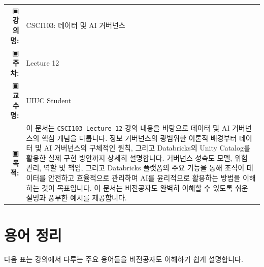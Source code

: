 \documentclass[11pt,a4paper]{article}
\makeatletter
\theoremstyle{definition}
\newcommand{\metainfo}[4]{
\begin{tcolorbox}[
    colback=lightpurple,
    colframe=darkpurple,
    boxrule=1pt,
    arc=2mm,
    left=10pt,
    right=10pt,
    top=8pt,
    bottom=8pt
]
\begin{tabular}{@{}rl@{}}
▣ \textbf{강의명:} & #1 \\[0.3em]
▣ \textbf{주차:} & #2 \\[0.3em]
▣ \textbf{교수명:} & #3 \\[0.3em]
▣ \textbf{목적:} & \begin{minipage}[t]{0.75\textwidth}#4\end{minipage}
\end{tabular}
\end{tcolorbox}
}
\makeatother
\begin{document}
\thispagestyle{firstpage}

\metainfo{CSCI103: 데이터 및 AI 거버넌스}{Lecture 12}{UIUC Student}{
이 문서는 \texttt{CSCI103 Lecture 12} 강의 내용을 바탕으로 데이터 및 AI 거버넌스의 핵심 개념을 다룹니다.
정보 거버넌스의 광범위한 이론적 배경부터 데이터 및 AI 거버넌스의 구체적인 원칙,
그리고 Databricks의 Unity Catalog를 활용한 실제 구현 방안까지 상세히 설명합니다.
거버넌스 성숙도 모델, 위험 관리, 역할 및 책임, 그리고 Databricks 플랫폼의 주요 기능을 통해
조직이 데이터를 안전하고 효율적으로 관리하며 AI를 윤리적으로 활용하는 방법을 이해하는 것이 목표입니다.
이 문서는 비전공자도 완벽히 이해할 수 있도록 쉬운 설명과 풍부한 예시를 제공합니다.
}

\tableofcontents

\newpage
\section*{용어 정리}

다음 표는 강의에서 다루는 주요 용어들을 비전공자도 이해하기 쉽게 설명합니다.
\end{document}
